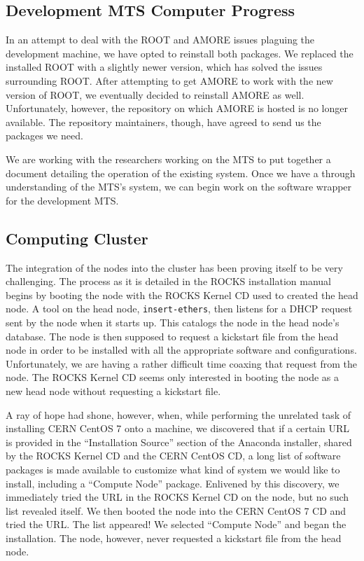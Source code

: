 \documentclass[12pt]{article}
\newcommand\tab[1][1cm]{\hspace*{#1}}
\begin{document}
\subsection{Development MTS Computer Progress}

\tab In an attempt to deal with the ROOT and AMORE issues plaguing the
development machine, we have opted to reinstall both packages. We replaced the
installed ROOT with a slightly newer version, which has solved the issues
surrounding ROOT. After attempting to get AMORE to work with the new version of
ROOT, we eventually decided to reinstall AMORE as well. Unfortunately, however,
the repository on which AMORE is hosted is no longer available. The repository
maintainers, though, have agreed to send us the packages we need.

\tab We are working with the researchers working on the MTS to put together a
document detailing the operation of the existing system. Once we have a
through understanding of the MTS's system, we can begin work on the software
wrapper for the development MTS.

\subsection{Computing Cluster}

\tab The integration of the nodes into the cluster has been proving itself to be
very challenging. The process as it is detailed in the ROCKS installation manual
begins by booting the node with the ROCKS Kernel CD used to created the head
node. A tool on the head node, {\tt insert-ethers}, then listens
for a DHCP request sent by the node when it starts up. This catalogs the node in
the head node's database. The node is then supposed to request a kickstart file
from the head node in order to be installed with all the appropriate software
and configurations. Unfortunately, we are having a rather difficult time coaxing
that request from the node. The ROCKS Kernel CD seems only interested in booting
the node as a new head node without requesting a kickstart file.

\tab A ray of hope had shone, however, when, while performing the unrelated task
of installing CERN CentOS 7 onto a machine, we discovered that if a certain URL
is provided in the ``Installation Source'' section of the Anaconda installer,
shared by the ROCKS Kernel CD and the CERN CentOS CD, a long list of software
packages is made available to customize what kind of system we would like to
install, including a ``Compute Node'' package. Enlivened by this discovery, we
immediately tried the URL in the ROCKS Kernel CD on the node, but no such list
revealed itself. We then booted the node into the CERN CentOS 7 CD and tried the
URL. The list appeared! We selected ``Compute Node'' and began the
installation. The node, however, never requested a kickstart file from the head
node. 
\end{document}

